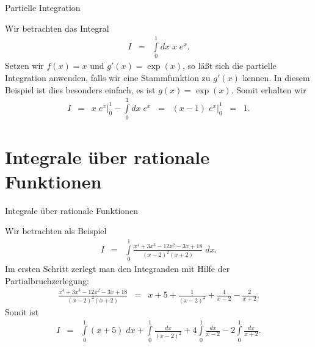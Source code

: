 \documentclass[german]{beamer}
\newcommand{\bq}{\begin{eqnarray*}}
\newcommand{\eq}{\end{eqnarray*}}
\begin{document}
\begin{frame}{Partielle Integration}

\begin{example}
Wir betrachten das Integral
\bq
 I & = &
 \int\limits_0^1 dx \; x \; e^x.
\eq
Setzen wir $f(x)=x$ und $g'(x)=\exp(x)$, so l\"a{\ss}t sich die partielle Integration anwenden,
falls wir eine Stammfunktion zu $g'(x)$ kennen. In diesem Beispiel ist dies besonders einfach,
es ist $g(x)=\exp(x)$. Somit erhalten wir
\bq
 I & = &
 \left. x \; e^x \right|_0^1
 - 
 \int\limits_0^1 dx \; e^x
 \;\; = \;\;
 \left. \left( x - 1 \right) \; e^x \right|_0^1
 \;\; = \;\;
 1.
\eq
\end{example}

\end{frame}


\section{Integrale \"uber rationale Funktionen}

\frame{\sectionpage}

\begin{frame}{Integrale \"uber rationale Funktionen}

Wir betrachten als Beispiel
\bq
 I & = & \int\limits_0^1 \frac{x^4+3x^3-12x^2-3x+18}{(x-2)^2(x+2)} \; dx.
\eq
Im ersten Schritt zerlegt man den Integranden mit Hilfe der Partialbruchzerlegung:
\bq
\frac{x^4+3x^3-12x^2-3x+18}{(x-2)^2(x+2)}
 & = & 
 x + 5 + \frac{1}{(x-2)^2} + \frac{4}{x-2} - \frac{2}{x+2}.
\eq
Somit ist
\bq
 I & = & 
 \int\limits_0^1 \left( x + 5 \right) \; dx 
 + \int\limits_0^1 \frac{dx}{(x-2)^2} 
 + 4 \int\limits_0^1 \frac{dx}{x-2} 
 - 2 \int\limits_0^1 \frac{dx}{x+2}.
\eq

\end{frame}
\end{document}
